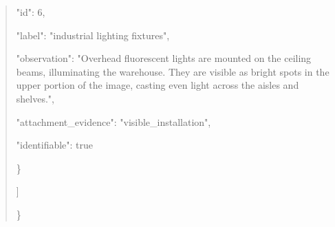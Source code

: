 \documentclass[10pt,a4paper]{article}
\begin{document}
\begin{quote}
      "id":\allowbreak{} 6,\allowbreak{}\par
      "label":\allowbreak{} "industrial lighting fixtures",\allowbreak{}\par
      "observation":\allowbreak{} "Overhead fluorescent lights are mounted on the ceiling beams,\allowbreak{} illuminating the warehouse. They are visible as bright spots in the upper portion of the image,\allowbreak{} casting even light across the aisles and shelves.",\allowbreak{}\par
      "attachment\_evidence":\allowbreak{} "visible\_installation",\allowbreak{}\par
      "identifiable":\allowbreak{} true\par
    \}\par
  ]\par
\}
\end{quote}
\end{document}
